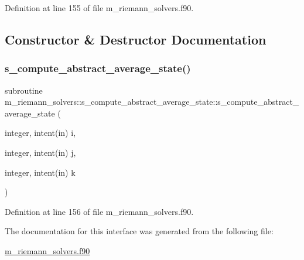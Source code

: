 Definition at line 155 of file m\+\_\+riemann\+\_\+solvers.\+f90.



\subsection{Constructor \& Destructor Documentation}
\mbox{\label{interfacem__riemann__solvers_1_1s__compute__abstract__average__state_a52aac2be9b8c2a470c9b8142ab33d805}} 
\subsubsection{\texorpdfstring{s\+\_\+compute\+\_\+abstract\+\_\+average\+\_\+state()}{s\_compute\_abstract\_average\_state()}}
{\footnotesize\ttfamily subroutine m\+\_\+riemann\+\_\+solvers\+::s\+\_\+compute\+\_\+abstract\+\_\+average\+\_\+state\+::s\+\_\+compute\+\_\+abstract\+\_\+average\+\_\+state (\begin{DoxyParamCaption}\item[{integer, intent(in)}]{i,  }\item[{integer, intent(in)}]{j,  }\item[{integer, intent(in)}]{k }\end{DoxyParamCaption})}



Definition at line 156 of file m\+\_\+riemann\+\_\+solvers.\+f90.



The documentation for this interface was generated from the following file\+:\begin{DoxyCompactItemize}
\item 
\hyperlink{m__riemann__solvers_8f90}{m\+\_\+riemann\+\_\+solvers.\+f90}\end{DoxyCompactItemize}

